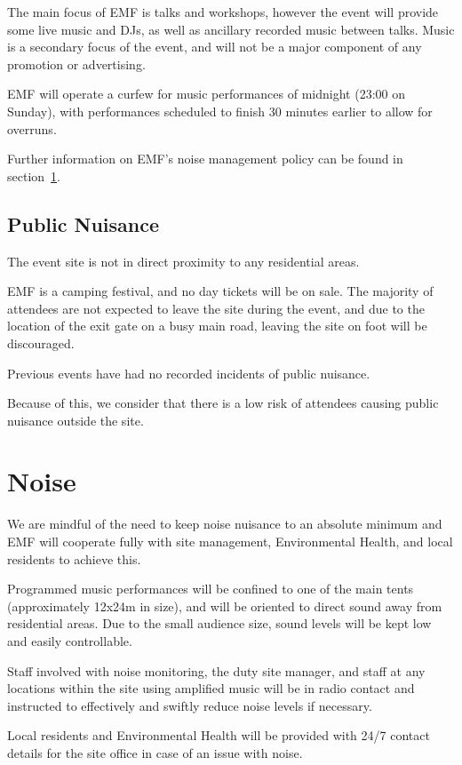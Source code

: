 The main focus of EMF is talks and workshops, however the event will provide some live music and DJs,
as well as ancillary recorded music between talks. Music is a secondary focus of the
event, and will not be a major component of any promotion or advertising.

EMF will operate a curfew for music performances of midnight (23:00 on Sunday), with
performances scheduled to finish 30 minutes earlier to allow for overruns.

Further information on EMF's noise management policy can be found in section~\ref{noise}.

\subsection{Public Nuisance}

The event site is not in direct proximity to any residential areas.

EMF is a camping festival, and no day tickets will be on sale. The majority of attendees are not expected to leave the site
during the event, and due to the location of the exit gate on a busy main road, leaving the site on foot will be discouraged.

Previous events have had no recorded incidents of public nuisance.

Because of this, we consider that there is a low risk of attendees causing public nuisance outside the site.

\section{Noise}
\label{noise}
We are mindful of the need to keep noise nuisance to an absolute minimum and EMF will cooperate fully
with site management, Environmental Health, and local residents to achieve this.

Programmed music performances will be confined to one of the main tents (approximately 12x24m in size),
and will be oriented to direct sound away from residential areas. Due to the
small audience size, sound levels will be kept low and easily controllable.

Staff involved with noise monitoring, the duty site manager, and staff at any locations within the site
using amplified music will be in radio contact and instructed to effectively and swiftly reduce noise
levels if necessary.

Local residents and Environmental Health will be provided with 24/7 contact details for the site office
in case of an issue with noise.


